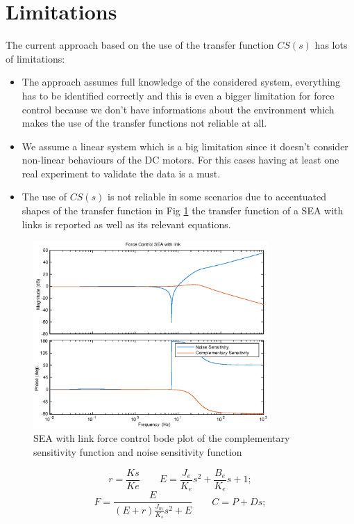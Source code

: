 \documentclass[a4paper,11pt]{article}
\begin{document}
\section{Limitations}

The current approach based on the use of the transfer function $CS(s)$ has lots of limitations:
\begin{itemize}
  \item The approach assumes full knowledge of the considered system, everything has to be identified correctly and this is even a bigger limitation for force control because we don't have informations about the environment which makes the use of the transfer functions not reliable at all.
  \item We assume a linear system which is a big limitation since it doesn't consider non-linear behaviours of the DC motors. For this cases having at least one real experiment to validate the data is a must.
  \item The use of $CS(s)$ is not reliable in some scenarios due to accentuated shapes of the transfer function in Fig \ref{fig:sea_tf} the transfer function of a SEA with links is reported as well as its relevant equations.
\end{itemize}

\begin{figure}[H]
\begin{center}
\includegraphics[width=0.8\textwidth]{images/sea_tf.eps}
\end{center}
\caption{SEA with link force control bode plot of the complementary sensitivity function and noise sensitivity function}
\label{fig:sea_tf}
\end{figure}

\[
  r = \frac{Ks}{Ke} \qquad
  E = \frac{J_e}{K_e}s^2 + \frac{B_e}{K_e}s + 1;
\]\[
  F = \frac{E}{(E + r)\frac{J_m}{K_s}s^2 + E} \qquad
  C = P + Ds;    
\]
\end{document}
